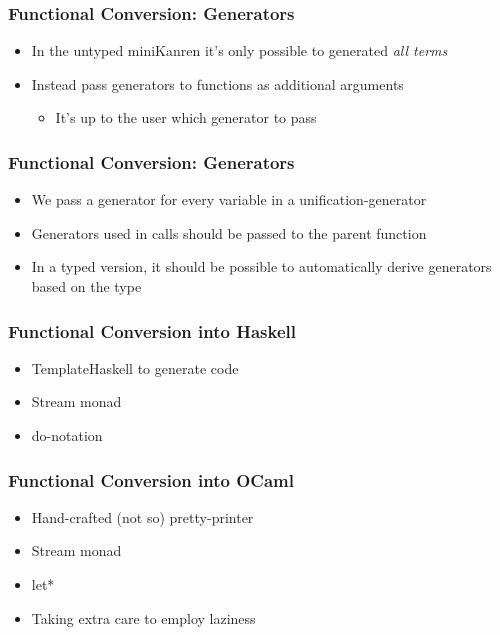 \documentclass[xcolor=table]{beamer}
\begin{document}
\begin{frame}[fragile]
  \frametitle{Functional Conversion: Generators}
\begin{itemize}
  \item In the untyped miniKanren it's only possible to generated \emph{all terms}
  \item Instead pass generators to functions as additional arguments
  \begin{itemize}
    \item It's up to the user which generator to pass
  \end{itemize}
\end{itemize}

\end{frame}

\begin{frame}[fragile]
  \frametitle{Functional Conversion: Generators}
    \begin{itemize}
        \item We pass a generator for every variable in a unification-generator
        \item Generators used in calls should be passed to the parent function
        \item In a typed version, it should be possible to automatically derive generators based on the type
    \end{itemize}
    
\end{frame}

\begin{frame}[fragile]
  \frametitle{Functional Conversion into Haskell}
  \begin{itemize}
    \item TemplateHaskell to generate code
    \item Stream monad
    \item do-notation
  \end{itemize}
\end{frame}

\begin{frame}[fragile]
  \frametitle{Functional Conversion into OCaml}
  \begin{itemize}
    \item Hand-crafted (not so) pretty-printer
    \item Stream monad
    \item let*
    \item Taking extra care to employ laziness
  \end{itemize}
\end{frame}
\end{document}
